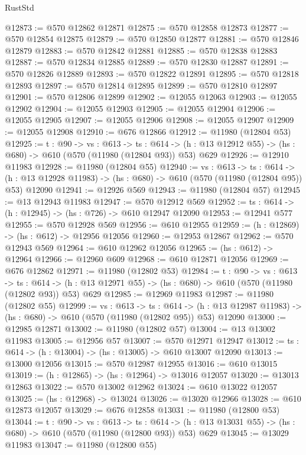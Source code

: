 \begin{lexlean}{RustStd}
\begin{coremodule}
@12873 := @570 @12862 @12871
@12875 := @570 @12858 @12873
@12877 := @570 @12854 @12875
@12879 := @570 @12850 @12877
@12881 := @570 @12846 @12879
@12883 := @570 @12842 @12881
@12885 := @570 @12838 @12883
@12887 := @570 @12834 @12885
@12889 := @570 @12830 @12887
@12891 := @570 @12826 @12889
@12893 := @570 @12822 @12891
@12895 := @570 @12818 @12893
@12897 := @570 @12814 @12895
@12899 := @570 @12810 @12897
@12901 := @570 @12806 @12899
@12902 := @12055 @12063
@12903 := @12055 @12902
@12904 := @12055 @12903
@12905 := @12055 @12904
@12906 := @12055 @12905
@12907 := @12055 @12906
@12908 := @12055 @12907
@12909 := @12055 @12908
@12910 := @676 @12866
@12912 := @11980 (@12804 @53)
@12925 := {t : @90} ->
  {vs : @613} ->
  {ts : @614} -> (h : @13 @12912 @55) -> (hs : @680) -> @610 (@570 (@11980 (@12804 @93)) @53) @629
@12926 := @12910 @11983
@12928 := @11980 (@12804 @55)
@12940 := {vs : @613} ->
  {ts : @614} ->
  (h : @13 @12928 @11983) -> (hs : @680) -> @610 (@570 (@11980 (@12804 @95)) @53) @12090
@12941 := @12926 @569
@12943 := @11980 (@12804 @57)
@12945 := @13 @12943 @11983
@12947 := @570 @12912 @569
@12952 := {ts : @614} -> (h : @12945) -> (hs : @726) -> @610 @12947 @12090
@12953 := @12941 @577
@12955 := @570 @12928 @569
@12956 := @610 @12955
@12959 := (h : @12869) -> (hs : @612) -> @12956 @12056
@12960 := @12953 @12867
@12962 := @570 @12943 @569
@12964 := @610 @12962 @12056
@12965 := (hs : @612) -> @12964
@12966 := @12960 @609
@12968 := @610 @12871 @12056
@12969 := @676 @12862
@12971 := @11980 (@12802 @53)
@12984 := {t : @90} ->
  {vs : @613} ->
  {ts : @614} -> (h : @13 @12971 @55) -> (hs : @680) -> @610 (@570 (@11980 (@12802 @93)) @53) @629
@12985 := @12969 @11983
@12987 := @11980 (@12802 @55)
@12999 := {vs : @613} ->
  {ts : @614} ->
  (h : @13 @12987 @11983) -> (hs : @680) -> @610 (@570 (@11980 (@12802 @95)) @53) @12090
@13000 := @12985 @12871
@13002 := @11980 (@12802 @57)
@13004 := @13 @13002 @11983
@13005 := @12956 @57
@13007 := @570 @12971 @12947
@13012 := {ts : @614} -> (h : @13004) -> (hs : @13005) -> @610 @13007 @12090
@13013 := @13000 @12056
@13015 := @570 @12987 @12955
@13016 := @610 @13015
@13019 := (h : @12865) -> (hs : @12964) -> @13016 @12057
@13020 := @13013 @12863
@13022 := @570 @13002 @12962
@13024 := @610 @13022 @12057
@13025 := (hs : @12968) -> @13024
@13026 := @13020 @12966
@13028 := @610 @12873 @12057
@13029 := @676 @12858
@13031 := @11980 (@12800 @53)
@13044 := {t : @90} ->
  {vs : @613} ->
  {ts : @614} -> (h : @13 @13031 @55) -> (hs : @680) -> @610 (@570 (@11980 (@12800 @93)) @53) @629
@13045 := @13029 @11983
@13047 := @11980 (@12800 @55)

\end{coremodule}
\end{lexlean}
